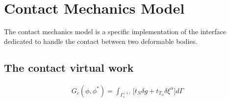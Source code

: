\chapter{Contact Mechanics Model\label{sect:cmm}}

The contact mechanics model is a specific implementation of the
 interface dedicated to handle the contact between two deformable bodies.

\section{The contact virtual work}
\begin{align}
G_c(\phi, \phi^{*}) = \int_{\Gamma_c^{(1)}}\Big[t_{N}\delta g + t_{T_{\alpha}}\delta\xi^{\alpha}\Big]d\Gamma
\end{align}
